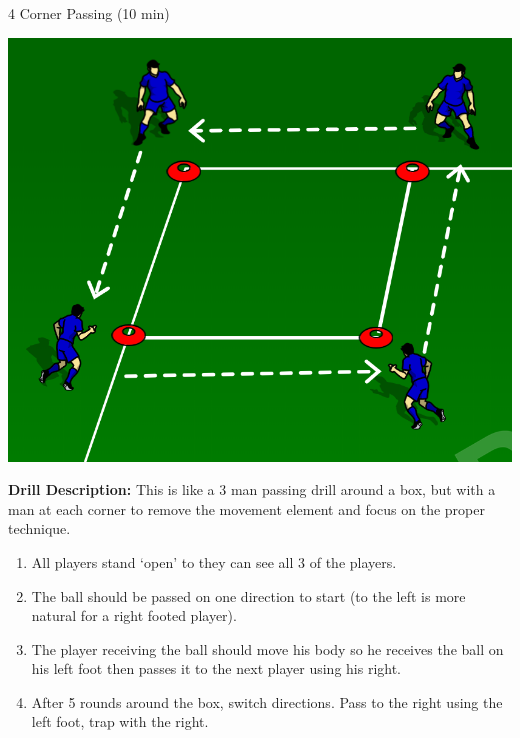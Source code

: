 \begin{evenBlock}{4 Corner Passing (10 min)}

\begin{minipage}[t]{\linewidth}
    \centering
    
    \begin{minipage}{.3\linewidth} %
        \includegraphics[width=\textwidth]{../img/Trimmed/Triangle_Passing_4P_mini}
    \end{minipage}
    \hspace{0.05\linewidth}
    \begin{minipage}{.6\linewidth} %
        \textbf{Drill Description:}
        This is like a 3 man passing drill around a box, but with a man at each corner to remove the movement element and focus on the proper technique.

        \vspace{3pt}
        \begin{enumerate}
            \setlength{\itemsep}{0pt}
            \setlength{\parskip}{0pt}
            \setlength{\parsep}{0pt}
            \item All players stand `open' to they can see all 3 of the players.
            \item The ball should be passed on one direction to start (to the left is more natural for a right footed player).
            \item The player receiving the ball should move his body so he receives the ball on his left foot then passes it to the next player using his right.
            \item After 5 rounds around the box, switch directions.  Pass to the right using the left foot, trap with the right.
        \end{enumerate}
        

\end{minipage}
\end{minipage}
\end{evenBlock}
